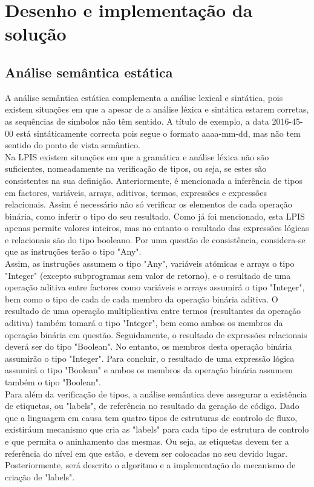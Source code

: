 \chapter{Desenho e implementação da solução}
\label{cap:desenho}

\section{Análise semântica estática}
\label{sec:semantica:desenho}

A análise semântica estática complementa a análise lexical e sintática, pois existem 
situações em que a apesar de a análise léxica e sintática estarem corretas, as
sequências de símbolos não têm sentido. A título de exemplo, a data 2016-45-00 está
sintáticamente correcta pois segue o formato aaaa-mm-dd, mas não tem sentido do ponto
de vista semântico.\\

Na LPIS existem situações em que a gramática e análise léxica não são suficientes, 
nomeadamente na verificação de tipos, ou seja, se estes são consistentes na sua definição.
Anteriormente, é mencionada a inferência de tipos em factores, variáveis, arrays, aditivos,
termos, expressões e expressões relacionais. Assim é necessário não só verificar os elementos
de cada operação binária, como inferir o tipo do seu resultado. 
Como já foi mencionado, esta LPIS apenas permite valores inteiros, mas no entanto o resultado
das expressões lógicas e relacionais são do tipo booleano. Por uma questão de consistência, 
considera-se que as instruções terão o tipo "Any".\\

Assim, as instruções assumem o tipo "Any", variáveis atómicas e arrays o tipo "Integer" 
(excepto subprogramas sem valor de retorno), e o resultado de uma operação aditiva
entre factores como variáveis e arrays assumirá o tipo "Integer", bem como o tipo de cada
de cada membro da operação binária aditiva. O resultado de uma operação multiplicativa entre
termos (resultantes da operação aditiva) também tomará o tipo "Integer", bem como ambos
os membros da operação binária em questão. Seguidamente, o resultado de expressões relacionais
deverá ser do tipo "Boolean". No entanto, os membros desta operação binária assumirão o tipo
"Integer". Para concluir, o resultado de uma expressão lógica assumirá o tipo "Boolean" e 
ambos os membros da operação binária assumem também o tipo "Boolean".\\

Para além da verificação de tipos, a análise semântica deve assegurar a existência de etiquetas,
ou "labels", de referência no resultado da geração de código. Dado que a linguagem em causa tem
quatro tipos de estruturas de controlo de fluxo, existiráum mecanismo que cria as "labels" 
para cada tipo de estrutura de controlo e que permita o aninhamento das mesmas. Ou seja, as 
etiquetas devem ter a referência do nível em que estão, e devem ser colocadas no seu devido lugar.
Posteriormente, será descrito o algoritmo e a implementação do mecanismo de criação de "labels".\\

